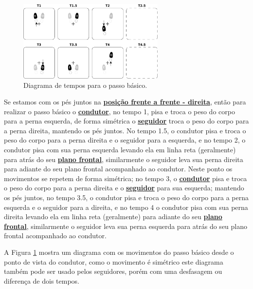 \begin{figure}[!b]
  \centering
    \includegraphics[width=0.65\textwidth]{chapters/cap-historia-passos/basico.eps}
  \caption{Diagrama de tempos para o passo básico.}
  \label{fig:histbaselineal}
\end{figure}

Se estamos com os pés juntos na \hyperref[def:ffd-position]{\textbf{posição frente a frente - direita}}, então
para realizar o passo básico 
o \hyperref[def:Condutor]{\textbf{condutor}}, no tempo 1, pisa e troca o peso do corpo 
para a perna esquerda, de forma simétrica o \hyperref[def:Seguidor]{\textbf{seguidor}} troca o peso do corpo para a perna direita, 
mantendo os pés juntos.
No tempo 1.5, o condutor pisa e troca o peso do corpo para a perna direita e o seguidor para a esquerda,
e no tempo 2, o condutor pisa com sua perna esquerda levando ela em linha reta (geralmente) para atrás do seu 
\hyperref[def:PlanoFrontal]{\textbf{plano frontal}}, 
similarmente o seguidor leva sua perna direita para adiante do seu plano frontal
acompanhado ao condutor.
Neste ponto os movimentos se repetem de forma simétrica; 
no tempo 3, o \hyperref[def:Condutor]{\textbf{condutor}} pisa e troca o peso do corpo 
para a perna direita e o \hyperref[def:Seguidor]{\textbf{seguidor}} para sua esquerda; 
mantendo os pés juntos, 
no tempo 3.5, o condutor pisa e troca o peso do corpo para a perna esquerda e o seguidor para a direita,
e no tempo 4 o condutor pisa com sua perna direita levando ela em linha reta (geralmente) para adiante do seu 
\hyperref[def:PlanoFrontal]{\textbf{plano frontal}}, 
similarmente o seguidor leva sua perna esquerda para atrás do seu plano frontal
acompanhado ao condutor.

A Figura \ref{fig:histbaselineal} mostra um diagrama com os movimentos do passo básico
desde o ponto de vista do condutor, 
como o movimento é simétrico este diagrama também pode ser usado pelos seguidores,
porém com uma desfasagem ou diferença de dois tempos.



